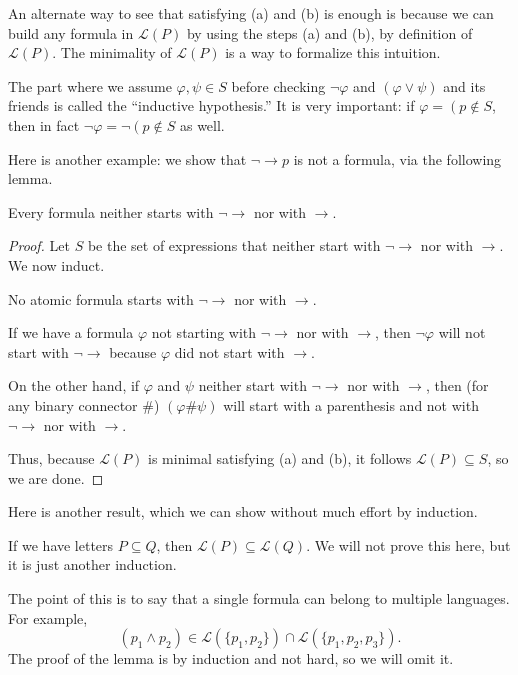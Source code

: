 An alternate way to see that satisfying (a) and (b) is enough is because we can build any formula in $\mathcal L(P)$ by using the steps (a) and (b), by definition of $\mathcal L(P)$. The minimality of $\mathcal L(P)$ is a way to formalize this intuition.
\begin{remark}
	The part where we assume $\varphi,\psi\in S$ before checking $\lnot\varphi$ and $(\varphi\lor\psi)$ and its friends is called the ``inductive hypothesis.'' It is very important: if $\varphi=\left(p\right.\notin S$, then in fact $\lnot\varphi=\lnot\left(p\right.\notin S$ as well.
\end{remark}
Here is another example: we show that $\lnot\to p$ is not a formula, via the following lemma.
\begin{lemma}
	Every formula neither starts with $\lnot\to$ nor with $\to$.
\end{lemma}
\begin{proof}
	Let $S$ be the set of expressions that neither start with $\lnot\to$ nor with $\to$. We now induct.
	\begin{listalph}
		\item No atomic formula starts with $\lnot\to$ nor with $\to$.
		\item If we have a formula $\varphi$ not starting with $\lnot\to$ nor with $\to$, then $\lnot\varphi$ will not start with $\lnot\to$ because $\varphi$ did not start with $\to$.

		On the other hand, if $\varphi$ and $\psi$ neither start with $\lnot\to$ nor with $\to$, then (for any binary connector $\#$) $(\varphi\#\psi)$ will start with a parenthesis and not with $\lnot\to$ nor with $\to$.
	\end{listalph}
	Thus, because $\mathcal L(P)$ is minimal satisfying (a) and (b), it follows $\mathcal L(P)\subseteq S$, so we are done.
\end{proof}
Here is another result, which we can show without much effort by induction.
\begin{lemma}
	If we have letters $P\subseteq Q$, then $\mathcal L(P)\subseteq\mathcal L(Q)$. We will not prove this here, but it is just another induction.
\end{lemma}
The point of this is to say that a single formula can belong to multiple languages. For example,
\[(p_1\land p_2)\in\mathcal L(\{p_1,p_2\})\cap\mathcal L(\{p_1,p_2,p_3\}).\]
The proof of the lemma is by induction and not hard, so we will omit it.%

